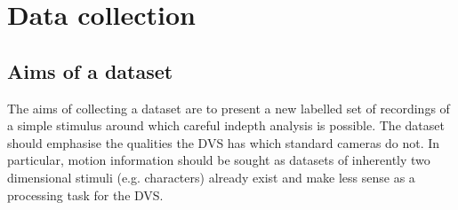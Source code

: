 \chapter{Data collection}

\section{Aims of a dataset}
The aims of collecting a dataset are to present a new labelled set of recordings of a simple stimulus around which careful indepth analysis is possible. 
The dataset should emphasise the qualities the DVS has which standard cameras do not. 
In particular, motion information should be sought as datasets of inherently two dimensional stimuli (e.g. characters) already exist and make less sense as a processing task for the DVS.




